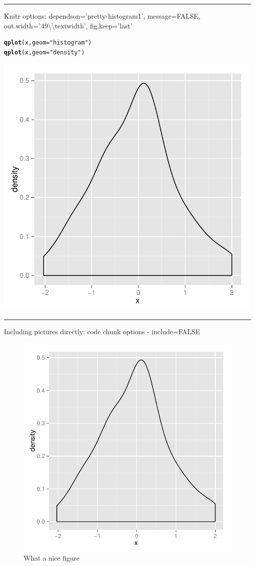 \documentclass{article}\usepackage[]{graphicx}\usepackage[]{color}
\makeatletter
\newcommand{\hlstr}[1]{\textcolor[rgb]{0.192,0.494,0.8}{#1}}%
\newcommand{\hlstd}[1]{\textcolor[rgb]{0.345,0.345,0.345}{#1}}%
\newcommand{\hlkwc}[1]{\textcolor[rgb]{0.333,0.667,0.333}{#1}}%
\newcommand{\hlkwd}[1]{\textcolor[rgb]{0.737,0.353,0.396}{\textbf{#1}}}%
\newenvironment{kframe}{%
 \def\at@end@of@kframe{}%
 \ifinner\ifhmode%
  \def\at@end@of@kframe{\end{minipage}}%
  \begin{minipage}{\columnwidth}%
 \fi\fi%
 \def\FrameCommand##1{\hskip\@totalleftmargin \hskip-\fboxsep
 \colorbox{shadecolor}{##1}\hskip-\fboxsep
     \hskip-\linewidth \hskip-\@totalleftmargin \hskip\columnwidth}%
 \MakeFramed {\advance\hsize-\width
   \@totalleftmargin\z@ \linewidth\hsize
   \@setminipage}}%
 {\par\unskip\endMakeFramed%
 \at@end@of@kframe}
\newenvironment{knitrout}{}{} %
\makeatother
\begin{document}
\hrule\vspace{12pt}
\noindent Knitr options: dependson='pretty-histogram1', message=FALSE, out.width='.49\textbackslash\textbackslash textwidth', fig.keep='last'

\begin{knitrout}
\color{fgcolor}\begin{kframe}
\begin{alltt}
\hlkwd{qplot}\hlstd{(x,} \hlkwc{geom} \hlstd{=} \hlstr{"histogram"}\hlstd{)}
\hlkwd{qplot}\hlstd{(x,} \hlkwc{geom} \hlstd{=} \hlstr{"density"}\hlstd{)}
\end{alltt}
\end{kframe}

{\centering \includegraphics[width=.49\textwidth]{figure/lots-of-plots4} 

}



\end{knitrout}


\clearpage
\hrule\vspace{12pt}
\noindent Including pictures directly: code chunk options - include=FALSE




\begin{figure}[h!]
\centering
\includegraphics[keepaspectratio=TRUE,width=.5\textwidth]{figure/lots-of-plots5}
\caption{What a nice figure}
\end{figure}
\end{document}
